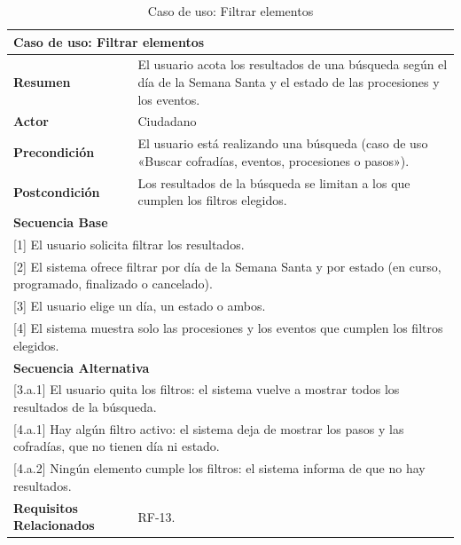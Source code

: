 \begin{table}[h!]
    \centering
    \renewcommand{\arraystretch}{1.5}

    \begin{tabular}{|p{4cm}|p{11cm}|}
        \hline
        \multicolumn{2}{|l|}{\textbf{Caso de uso: Filtrar elementos}} \\
        \hline
        \textbf{Resumen} & El usuario acota los resultados de una búsqueda según el día de la Semana Santa y el estado de las procesiones y los eventos. \\
        \hline
        \textbf{Actor} & Ciudadano \\
        \hline
        \textbf{Precondición} & El usuario está realizando una búsqueda (caso de uso «Buscar cofradías, eventos, procesiones o pasos»). \\
        \hline
        \textbf{Postcondición} & Los resultados de la búsqueda se limitan a los que cumplen los filtros elegidos. \\
        \hline
        \multicolumn{2}{|l|}{\textbf{Secuencia Base}} \\
        \hline
        \multicolumn{2}{|p{15cm}|}{ [1] El usuario solicita filtrar los resultados. } \\
        \hline
        \multicolumn{2}{|p{15cm}|}{ [2] El sistema ofrece filtrar por día de la Semana Santa y por estado (en curso, programado, finalizado o cancelado). } \\
        \hline
        \multicolumn{2}{|p{15cm}|}{ [3] El usuario elige un día, un estado o ambos. } \\
        \hline
        \multicolumn{2}{|p{15cm}|}{ [4] El sistema muestra solo las procesiones y los eventos que cumplen los filtros elegidos. } \\
        \hline
        \multicolumn{2}{|l|}{\textbf{Secuencia Alternativa}} \\
        \hline
        \multicolumn{2}{|p{15cm}|}{ [3.a.1] El usuario quita los filtros: el sistema vuelve a mostrar todos los resultados de la búsqueda. } \\
        \hline
        \multicolumn{2}{|p{15cm}|}{ [4.a.1] Hay algún filtro activo: el sistema deja de mostrar los pasos y las cofradías, que no tienen día ni estado. } \\
        \hline
        \multicolumn{2}{|p{15cm}|}{ [4.a.2] Ningún elemento cumple los filtros: el sistema informa de que no hay resultados. } \\
        \hline
        \textbf{Requisitos Relacionados} & RF-13. \\
        \hline
    \end{tabular}
    \caption{Caso de uso: Filtrar elementos}
\end{table}

